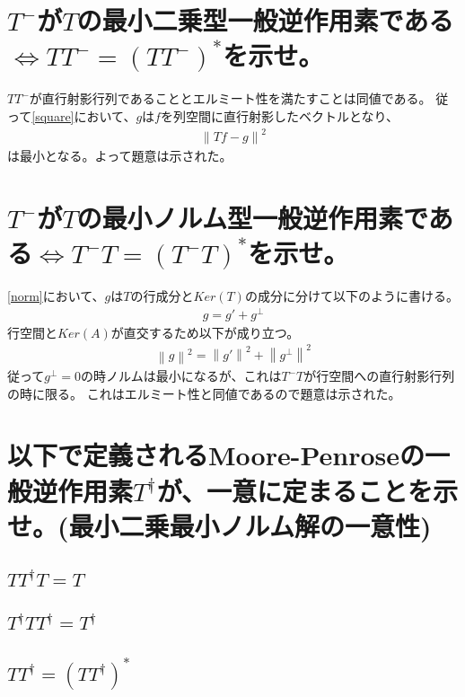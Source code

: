 \documentclass{ltjsarticle}
\begin{document}
\section{$T^-$が$T$の最小二乗型一般逆作用素である$\Leftrightarrow T T^- =(TT^-)^{\ast}$を示せ。}
$TT^-$が直行射影行列であることとエルミート性を満たすことは同値である。
従って\ref{square}において、$g$は$f$を列空間に直行射影したベクトルとなり、
\begin{align}
    \left\| Tf-g \right\|^2
\end{align}
は最小となる。よって題意は示された。
\section{$T^-$が$T$の最小ノルム型一般逆作用素である$\Leftrightarrow T^- T =(T^- T)^{\ast}$を示せ。}
\ref{norm}において、$g$は$T$の行成分と$Ker(T)$の成分に分けて以下のように書ける。
\begin{align}
    g  = g' + g^\bot 
\end{align}
行空間と$Ker(A)$が直交するため以下が成り立つ。
\begin{align}
    \left\| g \right\|^2 = \left\| g' \right\|^2 + \left\| g^\bot \right\|^2
\end{align}
従って$g^\bot=0$の時ノルムは最小になるが、これは$T^- T$が行空間への直行射影行列の時に限る。
これはエルミート性と同値であるので題意は示された。

\section{以下で定義されるMoore-Penroseの一般逆作用素$T^\dagger$が、一意に定まることを示せ。(最小二乗最小ノルム解の一意性)}
\label{MP}
\subsection{$T T^\dagger T = T$}
\label{a}
\subsection{$T^\dagger T T^\dagger = T^\dagger$}
\label{b}
\subsection{$T T^\dagger = (T T^\dagger)^\ast$}
\label{c}
\end{document}
